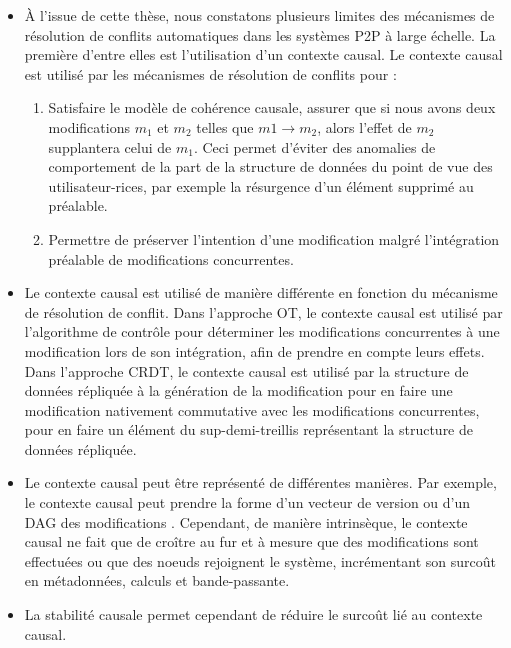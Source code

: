 \label{sec:manual-merge}

\begin{itemize}
    \item À l'issue de cette thèse, nous constatons plusieurs limites des mécanismes de résolution de conflits automatiques dans les systèmes \ac{P2P} à large échelle.
        La première d'entre elles est l'utilisation d'un contexte causal.
        Le contexte causal est utilisé par les mécanismes de résolution de conflits pour :
        \begin{enumerate}
            \item Satisfaire le modèle de cohérence causale, \ie assurer que si nous avons deux modifications $m_1$ et $m_2$ telles que $m1 \to m_2$, alors l'effet de $m_2$ supplantera celui de $m_1$.
                Ceci permet d'éviter des anomalies de comportement de la part de la structure de données du point de vue des utilisateur-rices, par exemple la résurgence d'un élément supprimé au préalable.
            \item Permettre de préserver l'intention d'une modification malgré l'intégration préalable de modifications concurrentes.
        \end{enumerate}
    \item Le contexte causal est utilisé de manière différente en fonction du mécanisme de résolution de conflit.
        Dans l'approche \ac{OT}, le contexte causal est utilisé par l'algorithme de contrôle pour déterminer les modifications concurrentes à une modification lors de son intégration, afin de prendre en compte leurs effets.
        Dans l'approche \ac{CRDT}, le contexte causal est utilisé par la structure de données répliquée à la génération de la modification pour en faire une modification nativement commutative avec les modifications concurrentes, \ie pour en faire un élément du sup-demi-treillis représentant la structure de données répliquée.
    \item Le contexte causal peut être représenté de différentes manières.
        Par exemple, le contexte causal peut prendre la forme d'un vecteur de version \cite{1988-version-vector-mattern,1991-version-vector-fidge} ou d'un \ac{DAG} des modifications \cite{1997-causal-barrier}.
        Cependant, de manière intrinsèque, le contexte causal ne fait que de croître au fur et à mesure que des modifications sont effectuées ou que des noeuds rejoignent le système, incrémentant son surcoût en métadonnées, calculs et bande-passante.
    \item La stabilité causale permet cependant de réduire le surcoût lié au contexte causal.

\end{itemize}
